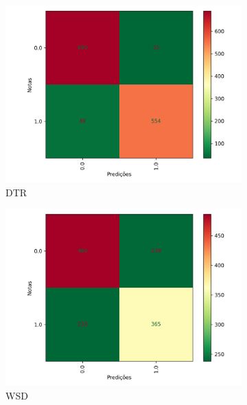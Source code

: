 \begin{figure}[!h]
\begin{subfigure}{0.4\textwidth}
 \includegraphics[width=\textwidth]{figuras/exemplo/sandstone-cmDTR.png}
 \caption{DTR}
\end{subfigure}
\hfill
\begin{subfigure}{0.4\textwidth}
 \centering
 \includegraphics[width=\textwidth]{figuras/exemplo/sandstone-cmWSD.png}
 \caption{WSD}
\end{subfigure}
\hfill
\begin{subfigure}{0.4\textwidth}
 \centering

\end{subfigure}
\end{figure}
